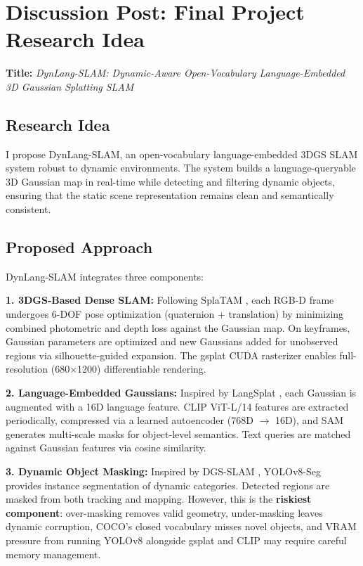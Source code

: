 \documentclass[10pt,twocolumn,letterpaper]{article}
\begin{document}
\section{Discussion Post: Final Project Research Idea}

\textbf{Title:} \textit{DynLang-SLAM: Dynamic-Aware Open-Vocabulary Language-Embedded 3D Gaussian Splatting SLAM}

\subsection{Research Idea}

I propose DynLang-SLAM, an open-vocabulary language-embedded 3DGS SLAM system robust to dynamic environments. The system builds a language-queryable 3D Gaussian map in real-time while detecting and filtering dynamic objects, ensuring that the static scene representation remains clean and semantically consistent.

\subsection{Proposed Approach}

DynLang-SLAM integrates three components:

\textbf{1. 3DGS-Based Dense SLAM:} Following SplaTAM \cite{keetha2024splatam}, each RGB-D frame undergoes 6-DOF pose optimization (quaternion + translation) by minimizing combined photometric and depth loss against the Gaussian map. On keyframes, Gaussian parameters are optimized and new Gaussians added for unobserved regions via silhouette-guided expansion. The gsplat CUDA rasterizer enables full-resolution (680$\times$1200) differentiable rendering.

\textbf{2. Language-Embedded Gaussians:} Inspired by LangSplat \cite{qin2024langsplat}, each Gaussian is augmented with a 16D language feature. CLIP ViT-L/14 features are extracted periodically, compressed via a learned autoencoder (768D $\rightarrow$ 16D), and SAM generates multi-scale masks for object-level semantics. Text queries are matched against Gaussian features via cosine similarity.

\textbf{3. Dynamic Object Masking:} Inspired by DGS-SLAM \cite{deng2024dgsslam}, YOLOv8-Seg provides instance segmentation of dynamic categories. Detected regions are masked from both tracking and mapping. However, this is the \textbf{riskiest component}: over-masking removes valid geometry, under-masking leaves dynamic corruption, COCO's closed vocabulary misses novel objects, and VRAM pressure from running YOLOv8 alongside gsplat and CLIP may require careful memory management.
\end{document}
